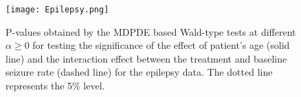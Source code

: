 \documentclass[a4paper]{article}%
\begin{document}
\begin{figure}[h]
	\centering
	\texttt{[image: Epilepsy.png]}
	\caption{P-values obtained by the MDPDE based Wald-type tests at different $\alpha\geq 0$ 
		for testing the significance of the effect of patient's age (solid line) and the interaction effect 
		between the treatment and baseline seizure rate (dashed line) for the epilepsy data. 
		The dotted line represents the 5\% level.}%
	\label{FIG:Edata}%
\end{figure}


%
%
%
%
%
%
%
\end{document}
